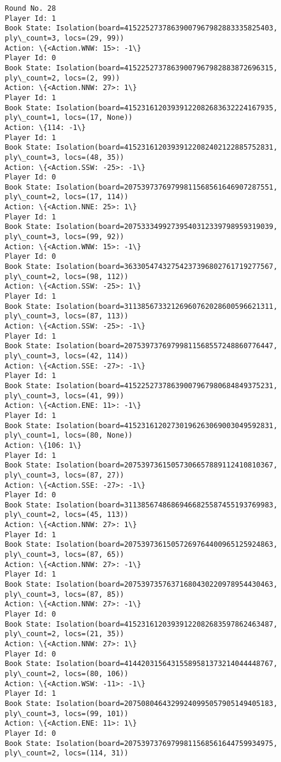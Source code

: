 \documentclass[11pt]{article}
\begin{document}
\begin{Verbatim}[commandchars=\\\{\}]
Round No. 28
Player Id: 1
Book State: Isolation(board=41522527378639007967982883335825403, ply\_count=3, locs=(29, 99))
Action: \{<Action.WNW: 15>: -1\}
Player Id: 0
Book State: Isolation(board=41522527378639007967982883872696315, ply\_count=2, locs=(2, 99))
Action: \{<Action.NNW: 27>: 1\}
Player Id: 1
Book State: Isolation(board=41523161203939122082683632224167935, ply\_count=1, locs=(17, None))
Action: \{114: -1\}
Player Id: 1
Book State: Isolation(board=41523161203939122082402122885752831, ply\_count=3, locs=(48, 35))
Action: \{<Action.SSW: -25>: -1\}
Player Id: 0
Book State: Isolation(board=20753973769799811568561646907287551, ply\_count=2, locs=(17, 114))
Action: \{<Action.NNE: 25>: 1\}
Player Id: 1
Book State: Isolation(board=20753334992739540312339798959319039, ply\_count=3, locs=(99, 92))
Action: \{<Action.WNW: 15>: -1\}
Player Id: 0
Book State: Isolation(board=36330547432754237396802761719277567, ply\_count=2, locs=(98, 112))
Action: \{<Action.SSW: -25>: 1\}
Player Id: 1
Book State: Isolation(board=31138567332126960762028600596621311, ply\_count=3, locs=(87, 113))
Action: \{<Action.SSW: -25>: -1\}
Player Id: 1
Book State: Isolation(board=20753973769799811568557248860776447, ply\_count=3, locs=(42, 114))
Action: \{<Action.SSE: -27>: -1\}
Player Id: 1
Book State: Isolation(board=41522527378639007967980684849375231, ply\_count=3, locs=(41, 99))
Action: \{<Action.ENE: 11>: -1\}
Player Id: 1
Book State: Isolation(board=41523161202730196263069003049592831, ply\_count=1, locs=(80, None))
Action: \{106: 1\}
Player Id: 1
Book State: Isolation(board=20753973615057306657889112410810367, ply\_count=3, locs=(87, 27))
Action: \{<Action.SSE: -27>: -1\}
Player Id: 0
Book State: Isolation(board=31138567486869466825587455193769983, ply\_count=2, locs=(45, 113))
Action: \{<Action.NNW: 27>: 1\}
Player Id: 1
Book State: Isolation(board=20753973615057269764400965125924863, ply\_count=3, locs=(87, 65))
Action: \{<Action.NNW: 27>: -1\}
Player Id: 1
Book State: Isolation(board=20753973576371680430220978954430463, ply\_count=3, locs=(87, 85))
Action: \{<Action.NNW: 27>: -1\}
Player Id: 0
Book State: Isolation(board=41523161203939122082683597862463487, ply\_count=2, locs=(21, 35))
Action: \{<Action.NNW: 27>: 1\}
Player Id: 0
Book State: Isolation(board=41442031564315589581373214044448767, ply\_count=2, locs=(80, 106))
Action: \{<Action.WSW: -11>: -1\}
Player Id: 1
Book State: Isolation(board=20750804643299240995057905149405183, ply\_count=3, locs=(99, 101))
Action: \{<Action.ENE: 11>: 1\}
Player Id: 0
Book State: Isolation(board=20753973769799811568561644759934975, ply\_count=2, locs=(114, 31))

\end{Verbatim}
\end{document}
